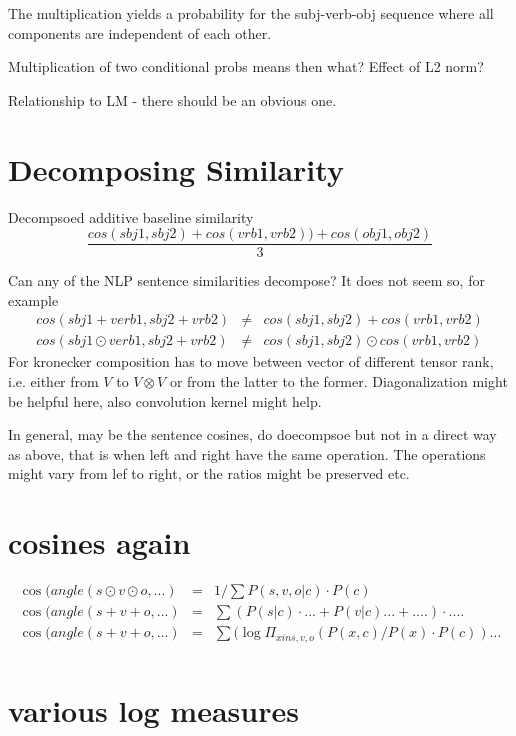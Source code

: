 The multiplication yields a probability
for the subj-verb-obj sequence where all
components are independent of each other.

Multiplication of two conditional probs means then what?
Effect of L2 norm?


Relationship to LM - there should be an obvious one.


\section{Decomposing Similarity}
Decompsoed additive baseline similarity
\[
\frac{cos(sbj1,sbj2) + cos(vrb1,vrb2)) + cos(obj1,obj2)}{3}
\]

Can any of the NLP sentence similarities decompose? It does not seem so, for example
\begin{eqnarray*}
cos(sbj1+verb1,sbj2+vrb2) &\neq& cos(sbj1, sbj2) + cos(vrb1,vrb2) \\
cos(sbj1\odot verb1,sbj2+vrb2) &\neq& cos(sbj1, sbj2) \odot cos(vrb1,vrb2)
\end{eqnarray*}
For kronecker composition has to move between vector of different tensor rank, i.e. either from $V$ to $V \otimes V$ or from the latter to the former. Diagonalization might be helpful here, also convolution kernel might help. 

In general, may be the sentence cosines, do doecompsoe but not in a direct way as above, that is when left and right have the same operation. The operations might vary from lef to right, or the ratios might be preserved etc. 



\section{cosines again}

\begin{eqnarray}
\cos(angle(s\odot v\odot o, ...) &=&  1/ \sum P(s,v,o|c) \cdot P(c)\\
\cos(angle(s+v+o, ...) &=& \sum (P(s|c)  \cdot  ... + P(v|c) ... + ....)  \cdot  ....\\
\cos(angle(s+v+o, ...) &=&  \sum (\log{\Pi_{x in s,v,o} (P(x,c)/P(x) \cdot P(c)) ...}\\
\end{eqnarray}

\section{various log measures}

